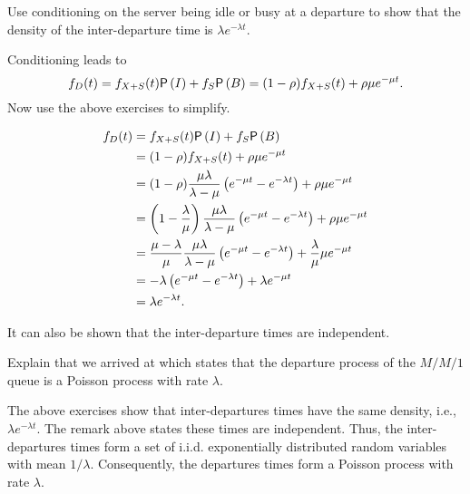 \begin{exercise}
Use conditioning on the server being idle or busy at a departure to show that  the density of  the inter-departure time is $\lambda e^{-\lambda t}$.
  \begin{hint}
Conditioning leads to 
\begin{equation*}
    f_D(t) = f_{X+S}(t) \P{I} + f_S \P B = (1-\rho) f_{X+S}(t) +
    \rho \mu e^{-\mu t}.
\end{equation*}
    Now use the above exercises to simplify.
  \end{hint}
  \begin{solution}
       \begin{align*}
    f_D(t) 
&= f_{X+S}(t) \P I + f_S \P B \\
&= (1-\rho) f_{X+S}(t) +    \rho \mu e^{-\mu t} \\
&= (1-\rho) \frac{\mu\lambda}{\lambda-\mu} \left(e^{-\mu t}-e^{-\lambda t}\right) +    \rho \mu e^{-\mu t} \\
&= \left(1-\frac{\lambda}\mu\right) \frac{\mu\lambda}{\lambda-\mu}\left(e^{-\mu t}-e^{-\lambda t}\right)  +    \rho \mu e^{-\mu t} \\
&= \frac{\mu-\lambda}\mu \frac{\mu\lambda}{\lambda-\mu}\left(e^{-\mu t}-e^{-\lambda t}\right)  +    \frac\lambda \mu \mu e^{-\mu t} \\
&= - \lambda\left(e^{-\mu t}-e^{-\lambda t}\right)  +    \lambda e^{-\mu t} \\
&=  \lambda e^{-\lambda t}.
      \end{align*}
  \end{solution}
\end{exercise}

It can also be shown that the inter-departure times are independent. 

\begin{exercise}\label{ex:burke}
Explain that we arrived at  which states that the departure process of the $M/M/1$ queue is a Poisson  process with rate $\lambda$. 
\begin{solution}
The above exercises show that inter-departures times have the same density, i.e., $\lambda e^{-\lambda t}$. The remark above states these times are independent. Thus,  the inter-departures times form a set of i.i.d. exponentially distributed random variables with mean $1/\lambda$. Consequently, the departures times form a Poisson process with rate $\lambda$.
\end{solution}
\end{exercise}

